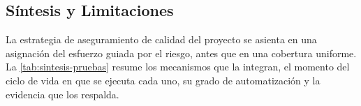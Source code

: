 \subsection{Síntesis y Limitaciones}\label{subsec:sintesis-pruebas}

La estrategia de aseguramiento de calidad del proyecto se asienta en una asignación del esfuerzo guiada por el riesgo, antes que en una cobertura uniforme. La \autoref{tab:sintesis-pruebas} resume los mecanismos que la integran, el momento del ciclo de vida en que se ejecuta cada uno, su grado de automatización y la evidencia que los respalda.

\newcommand\sintesisPruebasCaption{Mecanismos de aseguramiento de calidad, momento de ejecución y grado de automatización. \hspace{1em}}

